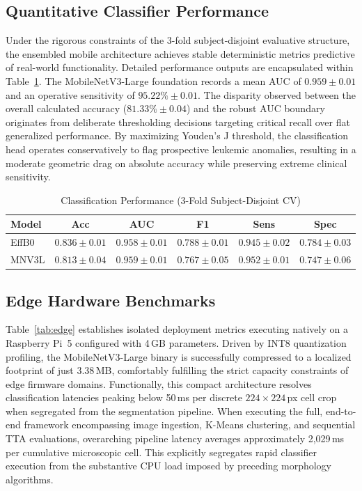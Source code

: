 \documentclass[journal]{IEEEtran}
\begin{document}
\subsection{Quantitative Classifier Performance}
Under the rigorous constraints of the 3-fold subject-disjoint evaluative structure, the ensembled mobile architecture achieves stable deterministic metrics predictive of real-world functionality. Detailed performance outputs are encapsulated within Table~\ref{tab:metrics}. The MobileNetV3-Large foundation records a mean AUC of $0.959 \pm 0.01$ and an operative sensitivity of $95.22\% \pm 0.01$. The disparity observed between the overall calculated accuracy ($81.33\% \pm 0.04$) and the robust AUC boundary originates from deliberate thresholding decisions targeting critical recall over flat generalized performance. By maximizing Youden's J threshold, the classification head operates conservatively to flag prospective leukemic anomalies, resulting in a moderate geometric drag on absolute accuracy while preserving extreme clinical sensitivity.

\begin{table}[!t]
\caption{Classification Performance (3-Fold Subject-Disjoint CV)}
\label{tab:metrics}
\centering
\begin{tabular}{@{}lccccc@{}}
\toprule
\textbf{Model} & \textbf{Acc} & \textbf{AUC} & \textbf{F1} & \textbf{Sens} & \textbf{Spec} \\ \midrule
EffB0 & $0.836 \pm 0.01$ & $0.958 \pm 0.01$ & $0.788 \pm 0.01$ & $0.945 \pm 0.02$ & $0.784 \pm 0.03$ \\
MNV3L & $0.813 \pm 0.04$ & $0.959 \pm 0.01$ & $0.767 \pm 0.05$ & $0.952 \pm 0.01$ & $0.747 \pm 0.06$ \\
\bottomrule
\end{tabular}
\end{table}

\subsection{Edge Hardware Benchmarks}
Table~\ref{tab:edge} establishes isolated deployment metrics executing natively on a Raspberry Pi~5 configured with 4\,GB parameters. Driven by INT8 quantization profiling, the MobileNetV3-Large binary is successfully compressed to a localized footprint of just 3.38\,MB, comfortably fulfilling the strict capacity constraints of edge firmware domains. Functionally, this compact architecture resolves classification latencies peaking below 50\,ms per discrete $224 \times 224$\,px cell crop when segregated from the segmentation pipeline.
When executing the full, end-to-end framework encompassing image ingestion, K-Means clustering, and sequential TTA evaluations, overarching pipeline latency averages approximately 2,029\,ms per cumulative microscopic cell. This explicitly segregates rapid classifier execution from the substantive CPU load imposed by preceding morphology algorithms.
\end{document}
